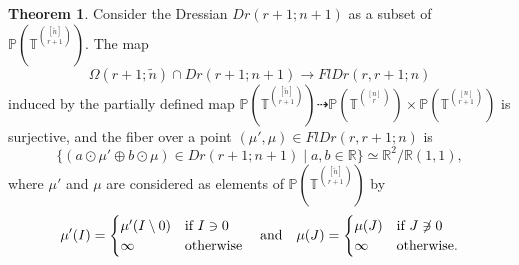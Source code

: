 \documentclass[11pt]{amsart}
\newcommand{\RR}{\mathbb R}
\newcommand{\PP}{\mathbb P}
\newcommand{\TT}{\mathbb T}
\theoremstyle{definition}
\newtheorem{thm}{Theorem}[subsection]
\newcommand{\madeline}[1]{{\color{magenta} \sf  Madeline: [#1]}}
\newcommand{\leon}[1]{{\color{teal} \sf Leon: [#1]}}
\newcommand{\chris}[1]{{\color{cyan} \sf Chris: [#1]}}
\begin{document}
\begin{thm}\label{thm:fibration}
Consider the Dressian $Dr(r+1;n+1)$ as a subset of $\PP(\TT^{[\widetilde n]\choose r+1})$.  The map 
\[
\Omega(r+1; \widetilde n) \cap  Dr(r+1;n+1) \to FlDr(r,r+1;n)
\]
induced by the partially defined map
$\PP(\TT^{[\widetilde n]\choose r+1}) \dashrightarrow \PP(\TT^{[n] \choose r}) \times \PP(\TT^{[n]\choose r+1})$
is surjective, and the fiber over a point $(\mu',\mu)\in FlDr(r,r+1;n)$ is
\[
\{(a\odot \mu' \oplus b\odot \mu) \in Dr(r+1;n+1) \mid a,b\in \RR\} \simeq \RR^2/\RR(1,1),
\]
where $\mu'$ and $\mu$ are considered as elements of $\PP(\TT^{[\widetilde n]\choose r+1})$ by 
\[
\mu'(I) = \begin{cases}
\mu'(I\setminus 0) & \textnormal{if $I \ni 0$}\\
\infty & \textnormal{otherwise}
\end{cases}
\quad \textnormal{and} \quad
\mu(J) = \begin{cases}
\mu(J) & \textnormal{if $J\not\ni 0$}\\
\infty & \textnormal{otherwise}.
\end{cases}
\]
\end{thm}


\end{document}
